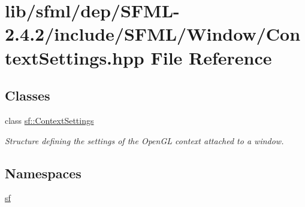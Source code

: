 \hypertarget{sfml_2dep_2_s_f_m_l-2_84_82_2include_2_s_f_m_l_2_window_2_context_settings_8hpp}{\section{lib/sfml/dep/\-S\-F\-M\-L-\/2.4.2/include/\-S\-F\-M\-L/\-Window/\-Context\-Settings.hpp File Reference}
\label{sfml_2dep_2_s_f_m_l-2_84_82_2include_2_s_f_m_l_2_window_2_context_settings_8hpp}
}
\subsection*{Classes}
\begin{DoxyCompactItemize}
\item 
class \hyperlink{structsf_1_1_context_settings}{sf\-::\-Context\-Settings}
\begin{DoxyCompactList}\small\item\em Structure defining the settings of the Open\-G\-L context attached to a window. \end{DoxyCompactList}\end{DoxyCompactItemize}
\subsection*{Namespaces}
\begin{DoxyCompactItemize}
\item 
\hyperlink{namespacesf}{sf}
\end{DoxyCompactItemize}
